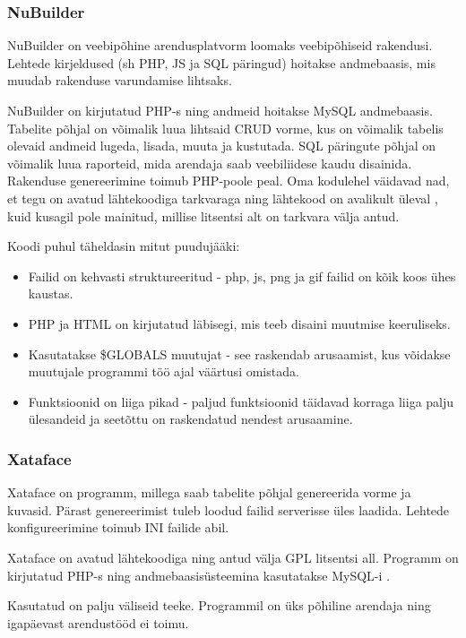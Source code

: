 \documentclass[a4paper,12pt]{article} %
\begin{document}
\subsubsection{NuBuilder}
NuBuilder on veebipõhine arendusplatvorm loomaks veebipõhiseid rakendusi. Lehtede kirjeldused (sh PHP, JS ja SQL päringud) hoitakse andmebaasis, mis muudab rakenduse varundamise lihtsaks.\par
NuBuilder on kirjutatud PHP-s ning andmeid hoitakse MySQL andmebaasis. Tabelite põhjal on võimalik luua lihtsaid CRUD vorme, kus on võimalik tabelis olevaid andmeid lugeda, lisada, muuta ja kustutada. SQL päringute põhjal on võimalik luua raporteid, mida arendaja saab veebiliidese kaudu disainida. Rakenduse genereerimine toimub PHP-poole peal. \cite{nuBuilder}
Oma kodulehel väidavad nad, et tegu on avatud lähtekoodiga tarkvaraga ning lähtekood on avalikult üleval \cite{nuBuilderGitHub}, kuid kusagil pole mainitud, millise litsentsi alt on tarkvara välja antud. \par
Koodi puhul täheldasin mitut puudujääki:
\begin{itemize}
\item Failid on kehvasti struktureeritud - php, js, png ja gif failid on kõik koos ühes kaustas.
\item PHP ja HTML on kirjutatud läbisegi, mis teeb disaini muutmise keeruliseks.
\item Kasutatakse \$GLOBALS muutujat - see raskendab arusaamist, kus võidakse muutujale programmi töö ajal väärtusi omistada.
\item Funktsioonid on liiga pikad - paljud funktsioonid täidavad korraga liiga palju ülesandeid ja seetõttu on raskendatud nendest arusaamine.
\end{itemize}

\subsubsection{Xataface}
Xataface on programm, millega saab tabelite põhjal genereerida vorme ja kuvasid. Pärast genereerimist tuleb loodud failid serverisse üles laadida. Lehtede konfigureerimine toimub INI failide abil.\cite{Xataface}\par
Xataface on avatud lähtekoodiga ning antud välja GPL litsentsi all. Programm on kirjutatud PHP-s \cite{PHP} ning andmebaasisüsteemina kasutatakse MySQL-i \cite{MySQL}.\par
Kasutatud on palju väliseid teeke. Programmil on üks põhiline arendaja ning igapäevast arendustööd ei toimu. \cite{XatafaceGitHub}
\end{document}
